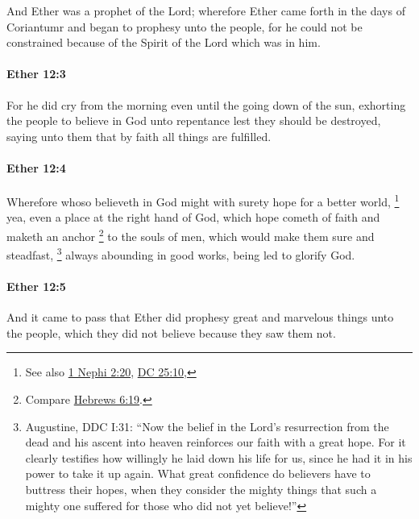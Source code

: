 			And Ether was a prophet of the Lord;
			wherefore Ether came forth in the days of Coriantumr
			and began to prophesy unto the people,
			for he could not be constrained
			because of the Spirit of the Lord which was in him.

		\paragraph{Ether 12:3} %
			\label{ETHER-12-3}

			For he did cry from the morning even until the going down of the sun,
			exhorting the people to believe in God unto repentance
			lest they should be destroyed,
			saying unto them that by faith all things are fulfilled.

		\paragraph{Ether 12:4} %
			\label{ETHER-12-4}

			Wherefore whoso believeth in God might with surety hope for a better world,%
				\footnote{%
					See also \hyperref[1NEPHI-2-20]{1 Nephi 2:20}, \hyperref[DC25-10]{DC 25:10}, 
					}
			yea, even a place at the right hand of God,
			which hope cometh of faith
			and maketh an anchor%
				\footnote{%
					Compare \hyperref[HEBREWS-6-19]{Hebrews 6:19}.
					}
			to the souls of men,
			which would make them sure and steadfast,%
				\footnote{%
					Augustine, DDC I:31: ``Now the belief in the Lord's resurrection from the dead and his ascent into heaven reinforces our faith with a great hope. For it clearly testifies how willingly he laid down his life for us, since he had it in his power to take it up again. What great confidence do believers have to buttress their hopes, when they consider the mighty things that such a mighty one suffered for those who did not yet believe!''
					}
			always abounding in good works,
			being led to glorify God.

		\paragraph{Ether 12:5} %
			\label{ETHER-12-5}

			And it came to pass that
			Ether did prophesy great and marvelous things unto the people,
			which they did not believe because they saw them not.

